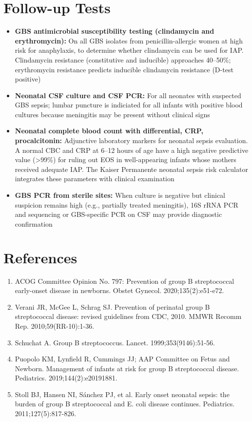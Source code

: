 \section*{Follow-up Tests}
\begin{itemize}
  \item \textbf{GBS antimicrobial susceptibility testing (clindamycin and erythromycin):} On all GBS isolates from penicillin-allergic women at high risk for anaphylaxis, to determine whether clindamycin can be used for IAP. Clindamycin resistance (constitutive and inducible) approaches 40--50\%; erythromycin resistance predicts inducible clindamycin resistance (D-test positive)
  \item \textbf{Neonatal CSF culture and CSF PCR:} For all neonates with suspected GBS sepsis; lumbar puncture is indiciated for all infants with positive blood cultures because meningitis may be present without clinical signs
  \item \textbf{Neonatal complete blood count with differential, CRP, procalcitonin:} Adjunctive laboratory markers for neonatal sepsis evaluation. A normal CBC and CRP at 6--12 hours of age have a high negative predictive value (>99\%) for ruling out EOS in well-appearing infants whose mothers received adequate IAP. The Kaiser Permanente neonatal sepsis risk calculator integrates these parameters with clinical examination
  \item \textbf{GBS PCR from sterile sites:} When culture is negative but clinical suspicion remains high (e.g., partially treated meningitis), 16S rRNA PCR and sequencing or GBS-specific PCR on CSF may provide diagnostic confirmation
\end{itemize}

\section*{References}
\begin{enumerate}
  \item ACOG Committee Opinion No. 797: Prevention of group B streptococcal early-onset disease in newborns. Obstet Gynecol. 2020;135(2):e51-e72.
  \item Verani JR, McGee L, Schrag SJ. Prevention of perinatal group B streptococcal disease: revised guidelines from CDC, 2010. MMWR Recomm Rep. 2010;59(RR-10):1-36.
  \item Schuchat A. Group B streptococcus. Lancet. 1999;353(9146):51-56.
  \item Puopolo KM, Lynfield R, Cummings JJ; AAP Committee on Fetus and Newborn. Management of infants at risk for group B streptococcal disease. Pediatrics. 2019;144(2):e20191881.
  \item Stoll BJ, Hansen NI, Sánchez PJ, et al. Early onset neonatal sepsis: the burden of group B streptococcal and E. coli disease continues. Pediatrics. 2011;127(5):817-826.
\end{enumerate}

\clearpage
